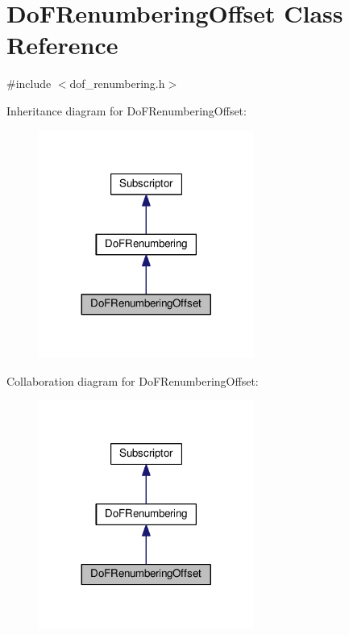 \hypertarget{class_do_f_renumbering_offset}{}\section{Do\+F\+Renumbering\+Offset Class Reference}
\label{class_do_f_renumbering_offset}


{\ttfamily \#include $<$dof\+\_\+renumbering.\+h$>$}



Inheritance diagram for Do\+F\+Renumbering\+Offset\+:\nopagebreak
\begin{figure}[H]
\begin{center}
\leavevmode
\includegraphics[width=200pt]{class_do_f_renumbering_offset__inherit__graph}
\end{center}
\end{figure}


Collaboration diagram for Do\+F\+Renumbering\+Offset\+:\nopagebreak
\begin{figure}[H]
\begin{center}
\leavevmode
\includegraphics[width=200pt]{class_do_f_renumbering_offset__coll__graph}
\end{center}
\end{figure}
